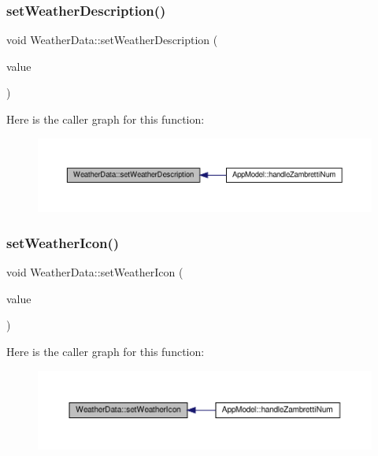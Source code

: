 \subsubsection{\texorpdfstring{set\+Weather\+Description()}{setWeatherDescription()}}
{\footnotesize\ttfamily void Weather\+Data\+::set\+Weather\+Description (\begin{DoxyParamCaption}\item[{const Q\+String \&}]{value }\end{DoxyParamCaption})}

Here is the caller graph for this function\+:\nopagebreak
\begin{figure}[H]
\begin{center}
\leavevmode
\includegraphics[width=350pt]{class_weather_data_a68686722f2e0bbf5cb28f0fdc96e280d_icgraph}
\end{center}
\end{figure}
\mbox{\label{class_weather_data_a2a8093aaf20e1fb3c63c429a4ae0a977}} 
\subsubsection{\texorpdfstring{set\+Weather\+Icon()}{setWeatherIcon()}}
{\footnotesize\ttfamily void Weather\+Data\+::set\+Weather\+Icon (\begin{DoxyParamCaption}\item[{const Q\+String \&}]{value }\end{DoxyParamCaption})}

Here is the caller graph for this function\+:\nopagebreak
\begin{figure}[H]
\begin{center}
\leavevmode
\includegraphics[width=350pt]{class_weather_data_a2a8093aaf20e1fb3c63c429a4ae0a977_icgraph}
\end{center}
\end{figure}
\mbox{\label{class_weather_data_afeefe6463c52698e2fc4c010d8d35dc2}} 
